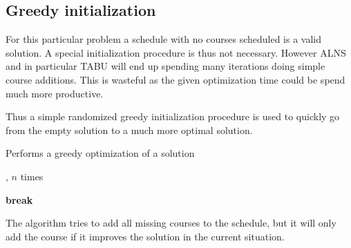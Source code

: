 \subsection{Greedy initialization}

For this particular problem a schedule with no courses scheduled is a valid solution. A special initialization procedure is thus not necessary. However ALNS and in particular TABU will end up spending many iterations doing simple course additions. This is wasteful as the given optimization time could be spend much more productive.

Thus a simple randomized greedy initialization procedure is used to quickly go from the empty solution to a much more optimal solution.

\begin{algorithm}[H]
  \caption{Performs a greedy optimization of a solution}
  \begin{algorithmic}[1]
       
        \State {}, $n$ times
      \EndFor
      \State
      
       
      \State
    
          \State
            \State {} 
            \State \textbf{break}
          \Else
            \State {} 
          \EndIf
        \EndFor
      \EndFor
    \EndFunction
  \end{algorithmic}
\end{algorithm}

The algorithm tries to add all missing courses to the schedule, but it will only add the course if it improves the solution in the current situation.
